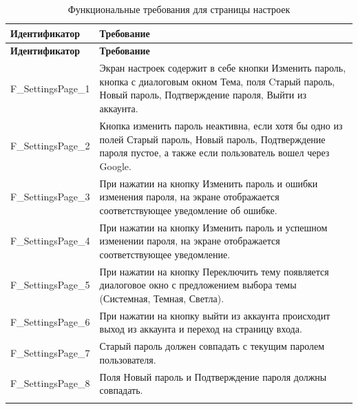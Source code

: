 \documentclass[a4paper, 14pt]{article}
\begin{document}
\begin{longtable}{| p{} | p{} |}
    \hline
    \textbf{Идентификатор}          & \textbf{Требование}                                                                                                                                                                \\
    \hline
    \endfirsthead
    \hline
    \textbf{Идентификатор}          & \textbf{Требование}                                                                                                                                                                \\
    \hline
    \endhead

    F\_SettingsPage\_1              & Экран настроек содержит в себе кнопки Изменить пароль, кнопка с диалоговым окном Тема, поля Cтарый пароль, Новый пароль, Подтверждение пароля, Выйти из аккаунта.                  \\ \hline
    F\_SettingsPage\_2              & Кнопка изменить пароль неактивна, если хотя бы одно из полей Старый пароль, Новый пароль, Подтверждение пароля пустое, а также если пользователь вошел через Google.        \\ \hline
    F\_SettingsPage\_3              & При нажатии на кнопку Изменить пароль и ошибки изменения пароля, на экране отображается соответствующее уведомление об ошибке.                                                     \\ \hline
    F\_SettingsPage\_4              & При нажатии на кнопку Изменить пароль и успешном изменении пароля, на экране отображается соответствующее уведомление.                                                             \\ \hline
    F\_SettingsPage\_5              & При нажатии на кнопку Переключить тему появляется диалоговое окно с предложением выбора темы (Системная, Темная, Светла).                                                                                               \\ \hline
    F\_SettingsPage\_6              & При нажатии на кнопку выйти из аккаунта происходит выход из аккаунта и переход на страницу входа.                                                                                   \\ \hline
    F\_SettingsPage\_7              & Старый пароль должен совпадать с текущим паролем пользователя.                                                                                   \\ \hline
    F\_SettingsPage\_8              & Поля Новый пароль и Подтверждение пароля должны совпадать.                                                                                   \\ \hline

    \caption{Функциональные требования для страницы настроек}
\end{longtable}
\end{document}
